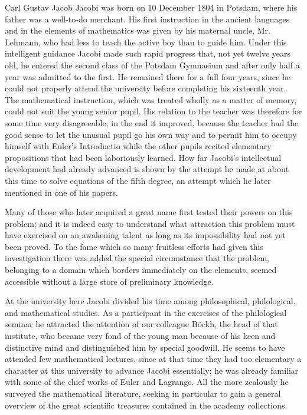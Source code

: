 \documentclass[11pt]{article}
\begin{document}
Carl Gustav Jacob Jacobi was born on 10 December 1804 in Potsdam, where his father was a well-to-do merchant. His first instruction in the ancient languages and in the elements of mathematics was given by his maternal uncle, Mr. Lehmann, who had less to teach the active boy than to guide him. Under this intelligent guidance Jacobi made such rapid progress that, not yet twelve years old, he entered the second class of the Potsdam Gymnasium and after only half a year was admitted to the first. He remained there for a full four years, since he could not properly attend the university before completing his sixteenth year. The mathematical instruction, which was treated wholly as a matter of memory, could not suit the young senior pupil. His relation to the teacher was therefore for some time very disagreeable; in the end it improved, because the teacher had the good sense to let the unusual pupil go his own way and to permit him to occupy himself with Euler's Introductio while the other pupils recited elementary propositions that had been laboriously learned. How far Jacobi's intellectual development had already advanced is shown by the attempt he made at about this time to solve equations of the fifth degree, an attempt which he later mentioned in one of his papers.

Many of those who later acquired a great name first tested their powers on this problem; and it is indeed easy to understand what attraction this problem must have exercised on an awakening talent as long as its impossibility had not yet been proved. To the fame which so many fruitless efforts had given this investigation there was added the special circumstance that the problem, belonging to a domain which borders immediately on the elements, seemed accessible without a large store of preliminary knowledge.

At the university here Jacobi divided his time among philosophical, philological, and mathematical studies. As a participant in the exercises of the philological seminar he attracted the attention of our colleague Böckh, the head of that institute, who became very fond of the young man because of his keen and distinctive mind and distinguished him by special goodwill. He seems to have attended few mathematical lectures, since at that time they had too elementary a character at this university to advance Jacobi essentially; he was already familiar with some of the chief works of Euler and Lagrange. All the more zealously he surveyed the mathematical literature, seeking in particular to gain a general overview of the great scientific treasures contained in the academy collections.
\end{document}
